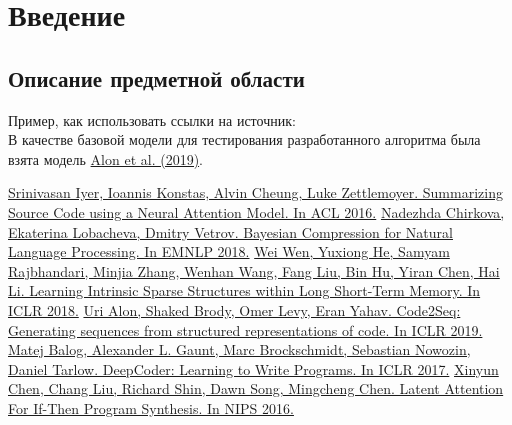\documentclass[a4paper,14pt]{extarticle}
\newcommand{\bibref}[3]{\hyperlink{#1}{#2 (#3)}} %
\begin{document}
\newpage

{
	\hypersetup{linkcolor=black}
	\tableofcontents
}

\newpage

\section{Введение} 
\subsection{Описание предметной области}

Пример, как использовать ссылки на источник:\\
В качестве базовой модели для тестирования разработанного алгоритма была взята модель \bibref{code2seq}{Alon et al.}{2019}.

\begin{thebibliography}{0}
\hypertarget{codenn}{}
\href{https://www.aclweb.org/anthology/P16-1195.pdf}
{Srinivasan Iyer, Ioannis Konstas, Alvin Cheung, Luke Zettlemoyer. Summarizing Source Code using a Neural Attention Model. In ACL 2016.}
\hypertarget{chirkova18}{}
\href{https://arxiv.org/abs/1810.10927}
{Nadezhda Chirkova, Ekaterina Lobacheva, Dmitry Vetrov. Bayesian Compression for Natural Language Processing. In EMNLP 2018.}
\hypertarget{iss}{}
\href{https://arxiv.org/abs/1709.05027}
{Wei Wen, Yuxiong He, Samyam Rajbhandari, Minjia Zhang, Wenhan Wang, Fang Liu, Bin Hu, Yiran Chen, Hai Li. Learning Intrinsic Sparse Structures within Long Short-Term Memory. In ICLR 2018.}
\hypertarget{code2seq}{}
\href{https://openreview.net/pdf?id=H1gKYo09tX}
{Uri Alon, Shaked Brody, Omer Levy, Eran Yahav. Code2Seq: Generating sequences from structured representations of code. In ICLR 2019.}
\hypertarget{deepcoder}{}
\href{https://arxiv.org/abs/1611.01989}
{Matej Balog, Alexander L. Gaunt, Marc Brockschmidt, Sebastian Nowozin, Daniel Tarlow. DeepCoder: Learning to Write Programs. In ICLR 2017.}
\hypertarget{latentatt}{}
\href{https://arxiv.org/abs/1611.01867v1}
{Xinyun Chen, Chang Liu, Richard Shin, Dawn Song, Mingcheng Chen. Latent Attention For If-Then Program Synthesis. In NIPS 2016.}
\end{thebibliography}
\end{document}
